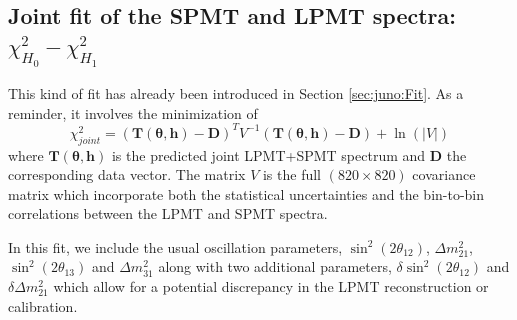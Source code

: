 \documentclass[../main.tex]{subfiles}
\begin{document}
%
%
%
%
%
%
%
%
%


\subsection{Joint fit of the SPMT and LPMT spectra: $\chi^2_{H_0}-\chi^2_{H_1}$}
\label{sec:joint_fit:hypothesis}

This kind of fit has already been introduced in Section \ref{sec:juno:Fit}.
As a reminder, it involves the minimization of
\begin{equation}
  \chi^2_{joint}=\left(\bm{T}(\bm{\theta},\bm{h}) - \bm{D} \right)^T V^{-1} \left(\bm{T}(\bm{\theta},\bm{h}) - \bm{D}  \right) + \ln(|V|)
\end{equation}
where $\bm{T}(\bm{\theta},\bm{h})$ is the predicted joint LPMT+SPMT spectrum and $\bm{D}$ the corresponding data vector. The matrix $V$ is the full $(820 \times 820)$ covariance matrix which incorporate both the statistical uncertainties and the bin-to-bin correlations between the LPMT and SPMT spectra.

In this fit, we include the usual oscillation parameters, $\sin^2 (2 \theta_{12})$, $\Delta m^2_{21}$, $\sin^2 (2\theta_{13})$ and $\Delta m^2_{31}$ along with two additional parameters, $\delta \sin^2(2\theta_{12})$ and $\delta \Delta m^2_{21}$ which allow for a potential discrepancy in the LPMT reconstruction or calibration.
\end{document}
